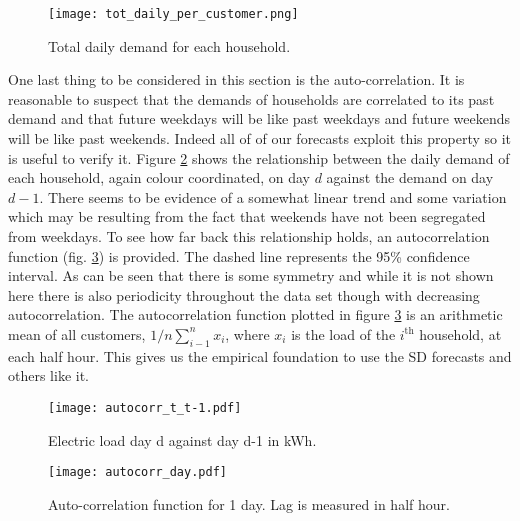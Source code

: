 \begin{figure}
\centering
\texttt{[image: tot\_daily\_per\_customer.png]}
\caption{Total daily demand for each household.}
\label{fig:totes}
\end{figure}

One last thing to be considered in this section is the auto-correlation. It is reasonable to suspect that the demands of households are correlated to its past demand and that future weekdays will be like past weekdays and future weekends will be like past weekends. Indeed all of of our forecasts exploit this property so it is useful to verify it.  Figure \ref{fig:ty_colour} shows the relationship between the daily demand of each household, again colour coordinated, on day $d$ against the demand on day $d-1$. There seems to be evidence of a somewhat linear trend and some variation which may be resulting from the fact that weekends have not been segregated from weekdays. To see how far back this relationship holds, an autocorrelation function (fig. \ref{fig:acf_day}) is provided. The dashed line represents the 95\% confidence interval. As can be seen that there is some symmetry and while it is not shown here there is also periodicity throughout the data set though with decreasing autocorrelation. The autocorrelation function plotted in figure \ref{fig:acf_day} is an arithmetic mean of all customers, $1/n \sum_{i-1}^{n} x_i$, where $x_i$ is the load of the $i^{\text{th}}$ household, at each half hour. This gives us the empirical foundation to use the SD forecasts and others like it.

\begin{figure}
\centering
\texttt{[image: autocorr\_t\_t-1.pdf]}
\caption{Electric load day d against day d-1 in kWh.}
\label{fig:ty_colour} 
\end{figure}

\begin{figure}
\centering
\texttt{[image: autocorr\_day.pdf]}
\caption{Auto-correlation function for 1 day. Lag is measured in half hour.}
\label{fig:acf_day} 
\end{figure}





